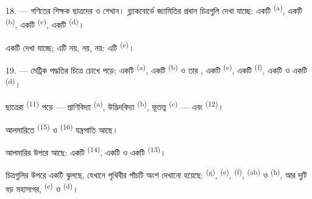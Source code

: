 \VUsaut{5.0mm}
\VUsaut{3.6mm}

18. --- গণিতের শিক্ষক ছাত্রদের   ও  শেখান। ব্ল্যাকবোর্ডে জ্যামিতির প্রধান
চিত্রগুলি দেখা যাচ্ছে: একটি  \textsuperscript{(a)}, একটি
 \textsuperscript{(b)}, একটি  \textsuperscript{(c)},
একটি  \textsuperscript{(d)}।

একটি  দেখা যাচ্ছে; এটি  নয়, 
নয়,  নয়: এটি  \textsuperscript{(e)}।

19. --- মেট্রিক পদ্ধতির চিত্রে চোখে পড়ে: একটি 
\textsuperscript{(a)}, একটি  \textsuperscript{(b)} ও তার
, একটি  \textsuperscript{(e)}, একটি
 \textsuperscript{(f)}, একটি  ও একটি
 \textsuperscript{(d)}।

ছাত্রেরা  \textsuperscript{(11)} পড়ে ---
প্রাণিবিদ্যা \textsuperscript{(a)}, উদ্ভিদবিদ্যা \textsuperscript{(b)},
ভূতত্ত্ব \textsuperscript{(c)} --- এবং  \textsuperscript{(12)}।

আলমারিতে  \textsuperscript{(15)} ও 
\textsuperscript{(16)} যন্ত্রপাতি আছে।

আলমারির উপরে আছে: একটি  \textsuperscript{(14)}, একটি
 ও একটি  \textsuperscript{(13)}।

চিত্রগুলির উপরে একটি  ঝুলছে, যেখানে পৃথিবীর পাঁচটি অংশ
দেখানো হয়েছে:  \textsuperscript{(g)}, 
\textsuperscript{(e)},  \textsuperscript{(f)}, 
\textsuperscript{(ab)} ও  \textsuperscript{(h)}, আর দুটি বড়
মহাসাগর,  \textsuperscript{(c)} ও 
\textsuperscript{(d)}।
\VUsaut{6.0mm}
\VUfilet{22mm}
